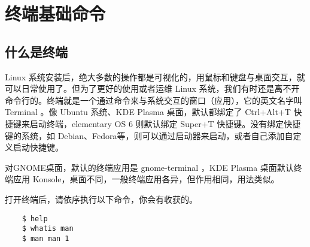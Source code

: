 
\ifx\all\undefined



\fi


\setcounter{chapter}{0}

\chapter{终端基础命令}


\section{什么是终端}

\par Linux 系统安装后，绝大多数的操作都是可视化的，用鼠标和键盘与桌面交互，就可以日常使用了。但为了更好的使用或者运维 Linux 系统，我们有时还是离不开命令行的。终端就是一个通过命令来与系统交互的窗口（应用），它的英文名字叫 Terminal 。像 Ubuntu 系统、KDE Plasma 桌面，默认都绑定了 Ctrl+Alt+T 快捷键来启动终端，elementary OS 6 则默认绑定 Super+T 快捷键。没有绑定快捷键的系统，如 Debian、Fedora等，则可以通过启动器来启动，或者自己添加自定义启动快捷键。
\par 对GNOME桌面，默认的终端应用是 gnome-terminal ，KDE Plasma 桌面默认终端应用 Konsole，桌面不同，一般终端应用各异，但作用相同，用法类似。
\par 打开终端后，请依序执行以下命令，你会有收获的。
\begin{lstlisting}
    $ help
    $ whatis man
    $ man man 1
\end{lstlisting}


\ifx\all\undefined

\fi
